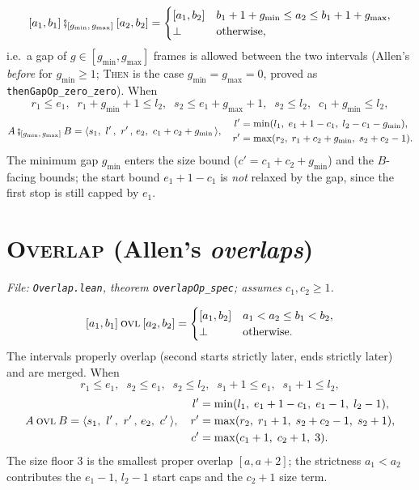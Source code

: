 \documentclass[11pt]{article}
\newcommand{\Empty}{\bot}                                 %
\newcommand{\R}[5]{\langle #1,\, #2,\, #3,\, #4,\, #5 \rangle} %
\newcommand{\gmin}{g_{\min}}
\newcommand{\gmax}{g_{\max}}
\newcommand{\ThenG}[2]{\mathbin{\fatsemi_{[#1,\,#2]}}}    %
\newcommand{\opname}[1]{\mathbin{\textsc{#1}}}
\newcommand{\Ovl}{\opname{ovl}}                           %
\theoremstyle{definition}
\theoremstyle{plain}
\begin{document}
\[
  [a_1,b_1] \ThenG{\gmin}{\gmax} [a_2,b_2] =
  \begin{cases} [a_1,b_2] & b_1+1+\gmin \le a_2 \le b_1+1+\gmax,\\
                \Empty & \text{otherwise,}\end{cases}
\]
i.e.\ a gap of $g\in[\gmin,\gmax]$ frames is allowed between the two intervals
(Allen's \emph{before} for $\gmin\ge1$; \textsc{Then} is the case
$\gmin=\gmax=0$, proved as \texttt{thenGapOp\_zero\_zero}).  When
\[
  r_1 \le e_1,\;\; r_1+\gmin+1 \le l_2,\;\; s_2 \le e_1+\gmax+1,\;\; s_2 \le l_2,\;\; c_1+\gmin \le l_2,
\]
\[
  A \ThenG{\gmin}{\gmax} B = \R{s_1}{\,l'\,}{\,r'\,}{e_2}{\,c_1+c_2+\gmin\,},\quad
  \begin{aligned}
    l' &= \min(l_1,\; e_1+1-c_1,\; l_2-c_1-\gmin),\\
    r' &= \max(r_2,\; r_1+c_2+\gmin,\; s_2+c_2-1).
  \end{aligned}
\]
The minimum gap $\gmin$ enters the size bound ($c'=c_1+c_2+\gmin$) and the
$B$-facing bounds; the start bound $e_1+1-c_1$ is \emph{not} relaxed by the gap,
since the first stop is still capped by $e_1$.

\section{\textsc{Overlap} (Allen's \emph{overlaps})}
\label{sec:overlap}
\textit{File: \texttt{Overlap.lean}, theorem \texttt{overlapOp\_spec}; assumes
$c_1,c_2\ge1$.}

\[
  [a_1,b_1] \Ovl [a_2,b_2] =
  \begin{cases} [a_1,b_2] & a_1 < a_2 \le b_1 < b_2,\\
                \Empty & \text{otherwise.}\end{cases}
\]
The intervals properly overlap (second starts strictly later, ends strictly
later) and are merged.  When
\[
  r_1 \le e_1,\;\; s_2 \le e_1,\;\; s_2 \le l_2,\;\; s_1+1 \le e_1,\;\; s_1+1 \le l_2,
\]
\[
  A \Ovl B = \R{s_1}{\,l'\,}{\,r'\,}{e_2}{\,c'\,},\quad
  \begin{aligned}
    l' &= \min(l_1,\; e_1+1-c_1,\; e_1-1,\; l_2-1),\\
    r' &= \max(r_2,\; r_1+1,\; s_2+c_2-1,\; s_2+1),\\
    c' &= \max(c_1+1,\; c_2+1,\; 3).
  \end{aligned}
\]
The size floor $3$ is the smallest proper overlap $[a,a+2]$; the strictness
$a_1<a_2$ contributes the $e_1-1$, $l_2-1$ start caps and the $c_2+1$ size term.
\end{document}
